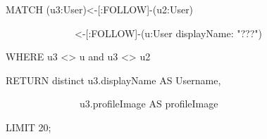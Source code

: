 \textcolor{mygreen}{MATCH}  (u3:User)<-[:FOLLOW]-(u2:User)\par
~~~~~~~~~~~~~~<-[:FOLLOW]-(u:User displayName: \textcolor{Dandelion}{"???"})\par
\textcolor{mygreen}{WHERE}  u3 <> u \textcolor{mygreen}{and}  u3 <> u2 \par
\textcolor{mygreen}{RETURN distinct}  u3.displayName  \textcolor{mygreen}{AS}  Username, \par
~~~~~~~~~~~~~~~u3.profileImage \textcolor{mygreen}{AS}  profileImage \par
\textcolor{mygreen}{LIMIT}  20;